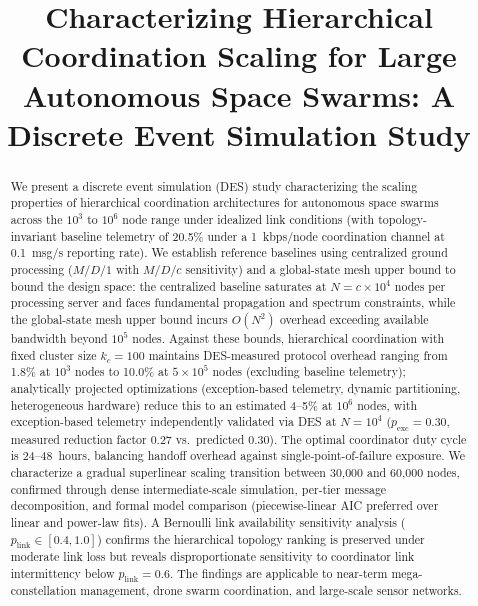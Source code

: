 \documentclass[journal]{IEEEtran}
\begin{document}
\title{Characterizing Hierarchical Coordination Scaling for Large Autonomous Space Swarms: A Discrete Event Simulation Study}

\author{
}


\maketitle

\begin{abstract}
We present a discrete event simulation (DES) study characterizing the scaling properties of hierarchical coordination architectures for autonomous space swarms across the $10^3$ to $10^6$ node range under idealized link conditions (with topology-invariant baseline telemetry of 20.5\% under a 1~kbps/node coordination channel at 0.1~msg/s reporting rate). We establish reference baselines using centralized ground processing ($M/D/1$ with $M/D/c$ sensitivity) and a global-state mesh upper bound to bound the design space: the centralized baseline saturates at $N = c \times 10^4$ nodes per processing server and faces fundamental propagation and spectrum constraints, while the global-state mesh upper bound incurs $O(N^2)$ overhead exceeding available bandwidth beyond $10^5$ nodes. Against these bounds, hierarchical coordination with fixed cluster size $k_c = 100$ maintains DES-measured protocol overhead ranging from 1.8\% at $10^3$ nodes to 10.0\% at $5 \times 10^5$ nodes (excluding baseline telemetry); analytically projected optimizations (exception-based telemetry, dynamic partitioning, heterogeneous hardware) reduce this to an estimated 4--5\% at $10^6$ nodes, with exception-based telemetry independently validated via DES at $N = 10^4$ ($p_{\text{exc}} = 0.30$, measured reduction factor 0.27 vs.\ predicted 0.30). The optimal coordinator duty cycle is 24--48~hours, balancing handoff overhead against single-point-of-failure exposure. We characterize a gradual superlinear scaling transition between 30{,}000 and 60{,}000 nodes, confirmed through dense intermediate-scale simulation, per-tier message decomposition, and formal model comparison (piecewise-linear AIC preferred over linear and power-law fits). A Bernoulli link availability sensitivity analysis ($p_{\text{link}} \in [0.4, 1.0]$) confirms the hierarchical topology ranking is preserved under moderate link loss but reveals disproportionate sensitivity to coordinator link intermittency below $p_{\text{link}} = 0.6$. The findings are applicable to near-term mega-constellation management, drone swarm coordination, and large-scale sensor networks.
\end{abstract}
\end{document}
